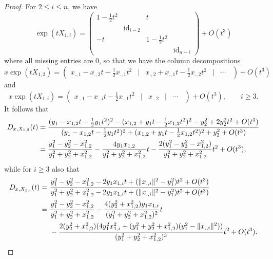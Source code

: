 \documentclass[11pt,oneside]{amsart}
\numberwithin{equation}{section}
\theoremstyle{remark}
\theoremstyle{plain}
\newcommand\id{\mathrm{id}}
\renewcommand\leq{\leqslant}
\renewcommand\geq{\geqslant}
\begin{document}
\begin{proof}
For $2 \leq i \leq n$, we have
$$\exp(t X_{1,i}) = \left(\begin{matrix}1 - \frac{1}{2} t^2 & & t & \\ & \boxed{\id_{i-2}} & \\ - t & & 1 - \frac{1}{2}t^2 & \\ &&&\boxed{ \id_{n-i} } \end{matrix}\right) + O(t^3)$$
where all missing entries are 0, so that we have the column decompositions
\[
x \exp(t X_{1,2}) = \left( \begin{matrix} x_{., 1} - x_{.,2} t - \frac{1}{2} x_{.,1}t^2 &|& x_{., 2} + x_{., 1} t - \frac{1}{2} x_{., 2} t^2 &|& \cdots \ \; \end{matrix}\right) + O(t^3)
\]
and
\[
x \exp(t X_{1,i}) = \left( \begin{matrix} x_{., 1} - x_{.,i} t - \frac{1}{2} x_{.,1}t^2 &|& x_{., 2} &|& \cdots \ \; \end{matrix}\right) + O(t^3), \qquad i\geq 3.
\]
It follows that
\begin{align}
\notag D_{x,X_{1,2}}(t)& = 
\frac{(y_1 - x_{1,2} t - \frac{1}{2} y_1t^2)^2 - (x_{1,2} + y_1 t - \frac{1}{2} x_{1,2} t^2)^2-y_2^2+2y_2^2t^2 +O(t^3)}{(y_1 - x_{1,2} t - \frac{1}{2} y_1t^2)^2 + (x_{1,2} + y_1 t - \frac{1}{2} x_{1,2} t^2)^2 +y_2^2+O(t^3)}\\
\label{x12} & = \frac{y_1^2 - y_2^2 - x_{1,2}^2}{y_1^2 + y_2^2 + x_{1,2}^2} - \frac{4 y_1 x_{1,2}}{y_1^2 + y_2^2 + x_{1,2}^2} t - \frac{2(y_1^2 - y_2^2 - x_{1,2}^2)}{y_1^2 + y_2^2 + x_{1,2}^2}t^2 + O(t^3),
\end{align}
while for $i\geq 3$ also that
\begin{align}
\notag D_{x,X_{1,i}}(t) = \ &\frac{y_1^2 - y_2^2 - x_{1,2}^2 - 2 y_1 x_{1,i} t + (\|x_{.,i}\|^2 - y_1^2 )t^2+O(t^3)}{y_1^2 + y_2^2 + x_{1,2}^2 - 2 y_1 x_{1,i} t + (\|x_{.,i}\|^2 - y_1^2 )t^2+O(t^3)}\\ 
\label{x1j} = \ &\frac{y_1^2 - y_2^2 - x_{1,2}^2}{y_1^2 + y_2^2 + x_{1,2}^2} - \frac{4(y_2^2 + x_{1,2}^2) y_1 x_{1,i}}{(y_1^2 + y_2^2 + x_{1,2}^2)^2} t \\
&\notag - \frac{2( y_2^2 + x_{1,2}^2) (4 y^2_1 x^2_{1,i} + (y_1^2 + y_2^2 + x_{1,2}^2) ( y_1^2 - \|x_{.,i}\|^2 ) )}{(y_1^2 + y_2^2 + x_{1,2}^2)^3} t^2 + O(t^3).
\end{align}


\end{proof}
\end{document}
